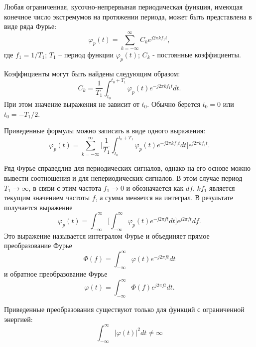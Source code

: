\documentclass[a4paper,14pt]{extarticle}
\begin{document}
Любая ограниченная, кусочно-непрервыная периодическая функция, имеющая конечное число экстремумов на протяжении периода, может быть представлена в виде ряда Фурье: 
\begin{equation*}
\varphi_p (t) = \sum_{k = -\infty}^{\infty} C_k e^{j 2 \pi k f_1 t} ,
\label{f1}
\end{equation*}
где $f_1 = 1 / T_1$; $T_1$ -- период функции $\varphi_p (t)$; $C_k$ - постоянные коэффициенты.

Коэффициенты могут быть найдены следующим образом:
\begin{equation*}
C_k = \frac{1}{T_1} \int_{t_0}^{t_0 + T_1} \varphi_p (t) e^{-j 2 \pi k f_1 t} dt.
\label{f2}
\end{equation*}
При этом значение выражения не зависит от $t_0$. Обычно берется $t_0 = 0$ или $t_0 = - T_1 / 2$.

Приведенные формулы можно записать в виде одного выражения:  
\begin{equation*}
\varphi_p (t) = \sum_{k = -\infty}^{\infty} \bigg[ \frac{1}{T_1} \int_{t_0}^{t_0 + T_1} \varphi_p (t) e^{-j 2 \pi k f_1 t} dt \bigg] e^{j 2 \pi k f_1 t}.
\label{f3}
\end{equation*}


Ряд Фурье справедлив для периодических сигналов, однако на его основе можно вывести соотношения и для непериодических сигналов. В этом случае период $T_1 \rightarrow \infty$, в связи с этим частота $f_1 \rightarrow 0$ и обозначается как $df$, $k f_1$ является текущим значением частоты $f$, а сумма меняется на интеграл. В результате получается выражение 
\begin{equation*}
\varphi_p (t) = \int_{-\infty}^{\infty} \bigg[ \int_{-\infty}^{\infty} \varphi_p (t) e^{-j 2 \pi f t} dt \bigg] e^{j 2 \pi f t} df.
\label{f4}
\end{equation*}
Это выражение называется интегралом Фурье и объединяет прямое преобразование Фурье
\begin{equation*}
\Phi (f) = \int_{-\infty}^{\infty} \varphi (t) e^{-j 2 \pi f t} dt
\end{equation*}
и обратное преобразование Фурье
\begin{equation*}
\varphi (t) = \int_{-\infty}^{\infty} \Phi (f) e^{j 2 \pi f t} dt.
\end{equation*}

Приведенные преобразования существуют только для функций с ограниченной энергией:
\begin{equation*}
\int_{-\infty}^{\infty} |\varphi (t)|^2 dt \neq \infty
\end{equation*}
\end{document}
